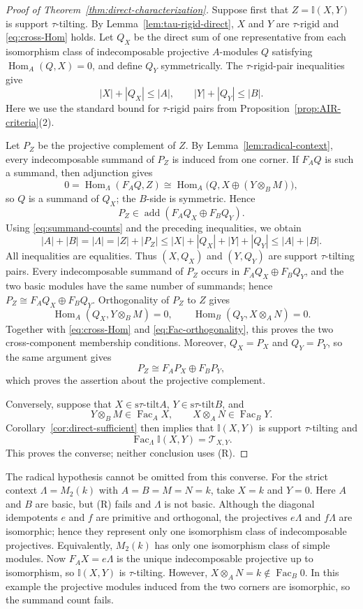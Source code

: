 \documentclass[11pt,reqno]{amsart}
\theoremstyle{definition}
\theoremstyle{remark}
\newcommand{\Fac}{\operatorname{Fac}}
\newcommand{\addc}{\operatorname{add}}
\newcommand{\Hom}{\operatorname{Hom}}
\newcommand{\stau}{\mathrm{s}\tau\text{-}\mathrm{tilt}}
\numberwithin{equation}{section}
\begin{document}
\begin{proof}[Proof of Theorem~\ref{thm:direct-characterization}]
Suppose first that $Z=\mathbb I(X,Y)$ is support $\tau$-tilting.  By
Lemma~\ref{lem:tau-rigid-direct}, $X$ and $Y$ are $\tau$-rigid and
\eqref{eq:cross-Hom} holds.  Let $Q_X$ be the direct sum of one representative
from each isomorphism class of indecomposable projective $A$-modules $Q$
satisfying $\Hom_A(Q,X)=0$, and
define $Q_Y$ symmetrically.  The $\tau$-rigid-pair inequalities give
\[
 |X|+|Q_X|\leq|A|,
 \qquad
 |Y|+|Q_Y|\leq|B|.
\]
Here we use the standard bound for $\tau$-rigid pairs from
Proposition~\ref{prop:AIR-criteria}\textup{(2)}.

Let $P_Z$ be the projective complement of $Z$.  By
Lemma~\ref{lem:radical-context}, every indecomposable summand of $P_Z$ is
induced from one corner.  If $F_AQ$ is such a summand, then adjunction gives
\[
 0=\Hom_\Lambda(F_AQ,Z)
  \cong\Hom_A\bigl(Q,X\oplus(Y\otimes_BM)\bigr),
\]
so $Q$ is a summand of $Q_X$; the $B$-side is symmetric.  Hence
\[
 P_Z\in\addc(F_AQ_X\oplus F_BQ_Y).
\]
Using \eqref{eq:summand-counts} and the preceding inequalities, we obtain
\[
 |A|+|B|=|\Lambda|=|Z|+|P_Z|
 \leq |X|+|Q_X|+|Y|+|Q_Y|
 \leq |A|+|B|.
\]
All inequalities are equalities.  Thus $(X,Q_X)$ and $(Y,Q_Y)$ are support
$\tau$-tilting pairs.  Every indecomposable summand of $P_Z$ occurs in
$F_AQ_X\oplus F_BQ_Y$, and the two basic modules have the same number of
summands; hence $P_Z\cong F_AQ_X\oplus F_BQ_Y$.
Orthogonality of $P_Z$ to $Z$ gives
\[
 \Hom_A(Q_X,Y\otimes_BM)=0,
 \qquad
 \Hom_B(Q_Y,X\otimes_AN)=0.
\]
Together with \eqref{eq:cross-Hom} and
\eqref{eq:Fac-orthogonality}, this proves the two cross-component
membership conditions.  Moreover, $Q_X=P_X$ and $Q_Y=P_Y$, so the same
argument gives
\[
 P_Z\cong F_AP_X\oplus F_BP_Y,
\]
which proves the assertion about the projective complement.

Conversely, suppose that $X\in\stau A$, $Y\in\stau B$, and
\[
 Y\otimes_BM\in\Fac_AX,
 \qquad
 X\otimes_AN\in\Fac_BY.
\]
Corollary~\ref{cor:direct-sufficient} then implies that $\mathbb I(X,Y)$
is support $\tau$-tilting and
\[
 \Fac_\Lambda\mathbb I(X,Y)=\mathcal T_{X,Y}.
\]
This proves the converse; neither conclusion uses \textup{(R)}.
\end{proof}

The radical hypothesis cannot be omitted from this converse.  For the
strict context $\Lambda=M_2(k)$ with $A=B=M=N=k$, take $X=k$ and $Y=0$.
Here $A$ and $B$ are basic, but \textup{(R)} fails and $\Lambda$ is not
basic.  Although the diagonal idempotents $e$ and $f$ are primitive and
orthogonal, the projectives $e\Lambda$ and $f\Lambda$ are isomorphic; hence
they represent only one isomorphism class of indecomposable projectives.
Equivalently, $M_2(k)$ has only one isomorphism class of simple modules.
Now $F_AX=e\Lambda$ is the unique indecomposable projective up to
isomorphism, so $\mathbb I(X,Y)$ is $\tau$-tilting.  However,
$X\otimes_AN=k\notin\Fac_B0$.  In this example the projective modules
induced from the two corners are isomorphic, so the summand count fails.
\end{document}

